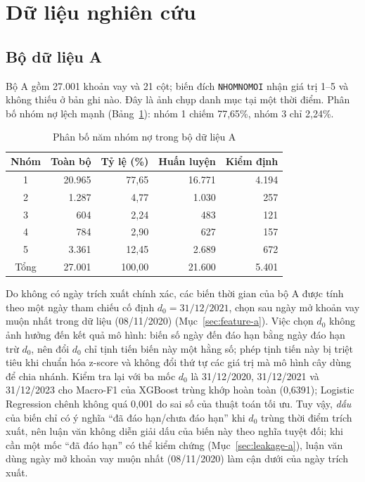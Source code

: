 \section{Dữ liệu nghiên cứu}

\subsection{Bộ dữ liệu A}
\label{sec:dataset-a-structure}

Bộ A gồm 27.001 khoản vay và 21 cột; biến đích \mbox{\texttt{NHOMNOMOI}} nhận giá trị 1--5 và không thiếu ở bản ghi nào. Đây là ảnh chụp danh mục tại một thời điểm. Phân bố nhóm nợ lệch mạnh (Bảng~\ref{tab:dataset-a-distribution}): nhóm 1 chiếm 77,65\%, nhóm 3 chỉ 2,24\%.

\begin{table}[H]
\centering
\caption{Phân bố năm nhóm nợ trong bộ dữ liệu A}
\label{tab:dataset-a-distribution}
\begin{tabular}{|c|r|r|r|r|}
\hline
Nhóm & Toàn bộ & Tỷ lệ (\%) & Huấn luyện & Kiểm định\\
\hline
1 & 20.965 & 77,65 & 16.771 & 4.194\\
2 & 1.287 & 4,77 & 1.030 & 257\\
3 & 604 & 2,24 & 483 & 121\\
4 & 784 & 2,90 & 627 & 157\\
5 & 3.361 & 12,45 & 2.689 & 672\\
\hline
Tổng & 27.001 & 100,00 & 21.600 & 5.401\\
\hline
\end{tabular}
\end{table}

Do không có ngày trích xuất chính xác, các biến thời gian của bộ A được tính theo một ngày tham chiếu cố định $d_0=31/12/2021$, chọn sau ngày mở khoản vay muộn nhất trong dữ liệu (08/11/2020) (Mục~\ref{sec:feature-a}). Việc chọn $d_0$ không ảnh hưởng đến kết quả mô hình: biến số ngày đến đáo hạn bằng ngày đáo hạn trừ $d_0$, nên đổi $d_0$ chỉ tịnh tiến biến này một hằng số; phép tịnh tiến này bị triệt tiêu khi chuẩn hóa z-score và không đổi thứ tự các giá trị mà mô hình cây dùng để chia nhánh. Kiểm tra lại với ba mốc $d_0$ là 31/12/2020, 31/12/2021 và 31/12/2023 cho Macro-F1 của XGBoost trùng khớp hoàn toàn (0,6391); Logistic Regression chênh không quá 0,001 do sai số của thuật toán tối ưu. Tuy vậy, \emph{dấu} của biến chỉ có ý nghĩa ``đã đáo hạn/chưa đáo hạn'' khi $d_0$ trùng thời điểm trích xuất, nên luận văn không diễn giải dấu của biến này theo nghĩa tuyệt đối; khi cần một mốc ``đã đáo hạn'' có thể kiểm chứng (Mục~\ref{sec:leakage-a}), luận văn dùng ngày mở khoản vay muộn nhất (08/11/2020) làm cận dưới của ngày trích xuất.

